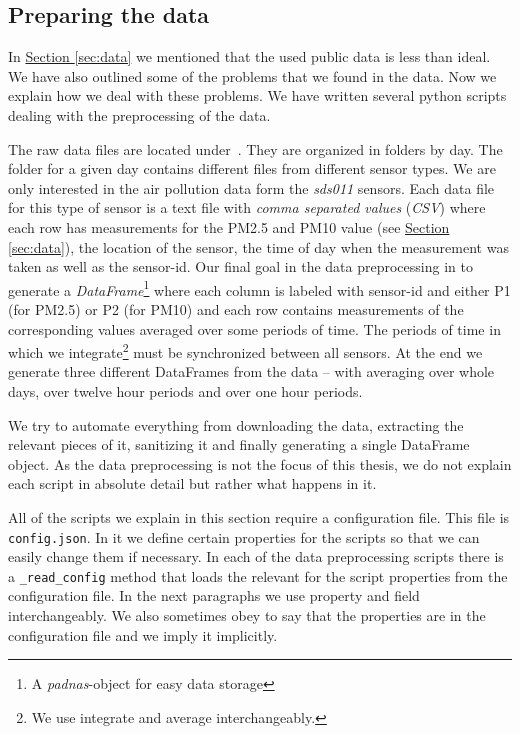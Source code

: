 \documentclass[12pt,a4paper,twoside]{scrartcl}
\numberwithin{equation}{section}
\newcommand{\refsec}[1]{\hyperref[#1]{Section \ref*{#1}}}
\begin{document}
\subsection{Preparing the data}\label{sec:prep-data}
In \refsec{sec:data} we mentioned that the used public data is less than ideal. We have also outlined some of the problems that we found in the data. Now we explain how we deal with these problems. We have written several python scripts dealing with the preprocessing of the data. 

The raw data files are located under~\cite{luftdaten}. They are organized in folders by day. The folder for a given day contains different files from different sensor types. We are only interested in the air pollution data form the \emph{sds011} sensors. Each data file for this type of sensor is a text file with \emph{comma separated values} (\emph{CSV}) where each row has measurements for the PM2.5 and PM10 value (see \refsec{sec:data}), the location of the sensor, the time of day when the measurement was taken as well as the sensor-id. Our final goal in the data preprocessing in to generate a \emph{DataFrame}\footnote{A \emph{padnas}-object for easy data storage} where each column is labeled with sensor-id and either P1 (for PM2.5) or P2 (for PM10) and each row contains measurements of the corresponding values averaged over some periods of time. The periods of time in which we integrate\footnote{We use integrate and average interchangeably.} must be synchronized between all sensors. At the end we generate three different DataFrames from the data -- with averaging over whole days, over twelve hour periods and over one hour periods.

We try to automate everything from downloading the data, extracting the relevant pieces of it, sanitizing it and finally generating a single DataFrame object. As the data preprocessing is not the focus of this thesis, we do not explain each script in absolute detail but rather what happens in it.

All of the scripts we explain in this section require a configuration file. This file is \texttt{config.json}. In it we define certain properties for the scripts so that we can easily change them if necessary. In each of the data preprocessing scripts there is a \texttt{\_read\_config} method that loads the relevant for the script properties from the configuration file. In the next paragraphs we use property and field interchangeably. We also sometimes obey to say that the properties are in the configuration file and we imply it implicitly.
\end{document}
